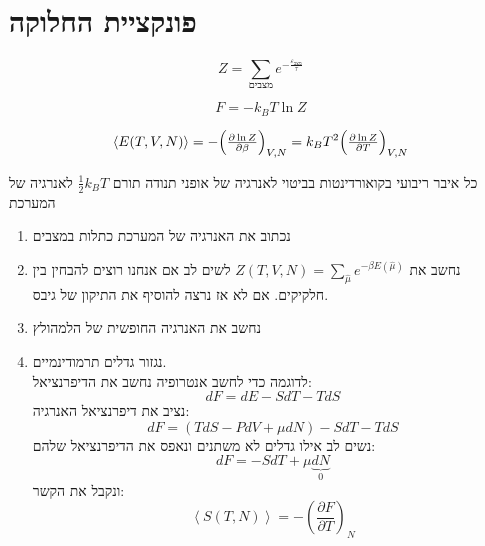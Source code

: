 \section{פונקציית החלוקה}
\begin{cheatformula}
$$Z = \sum_\text{מצבים} e^{-\tfrac{\varepsilon_\text{מצב}}{\tau}}$$
\end{cheatformula}
\begin{cheatformula}
$$F=-k_BT\ln{Z}$$    
\end{cheatformula}

\begin{cheatformula}
\begin{align*}
    \left< E(T,V,N) \right> = - \Bigl(\tfrac{\partial \ln{Z}}{\partial \beta}\Bigr)_{V,N} = 
    k_B T^2 \Bigl(\tfrac{\partial \ln{Z}}{\partial T}\Bigr)_{V,N}
\end{align*}

\begin{cheatformula}
    כל איבר ריבועי בקואורדינטות בביטוי לאנרגיה של אופני תנודה תורם $\frac{1}{2}k_BT$ לאנרגיה של המערכת
\end{cheatformula}

\end{cheatformula}

\begin{cheatformula}
    \begin{enumerate}
        \item נכתוב את האנרגיה של המערכת כתלות במצבים
        \item נחשב את $Z\left(T,V,N\right) = \sum_{\hat{\mu}} e^{-\beta E\left(\hat{\mu}\right)}$
        לשים לב אם אנחנו רוצים להבחין בין חלקיקים. אם לא אז נרצה להוסיף את התיקון של גיבס.
        \item נחשב את האנרגיה החופשית של הלמהולץ
        \item נגזור גדלים תרמודינמיים. \\
        לדוגמה כדי לחשב אנטרופיה נחשב את הדיפרנציאל:
        $$ dF = dE - SdT - TdS$$
        נציב את דיפרנציאל האנרגיה:
        $$dF = \left( TdS -PdV + \mu dN \right) - SdT - TdS$$
        נשים לב אילו גדלים לא משתנים ונאפס את הדיפרנציאל שלהם:
        $$dF = -SdT + \mu \underset{0}{\underbrace{dN}}$$
        ונקבל את הקשר:
        $$\left< S \left(T,N\right) \right> = - \left( \frac{\partial F}{\partial T} \right)_N$$
    \end{enumerate}
\end{cheatformula}
